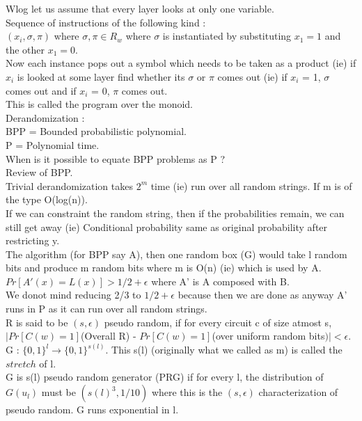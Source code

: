 \documentclass[solution,addpoints,12pt]{exam}
\begin{document}
Wlog let us assume that every layer looks at only one variable.\\
Sequence of instructions of the following kind :\\
$(x_i, \sigma, \pi)$ where $\sigma, \pi \in R_w$
where $\sigma$ is instantiated by substituting $x_1 = 1$ and the other
$x_1 = 0$.\\
Now each instance pops out a symbol which needs to be taken as a product (ie)
if $x_i$ is looked at some layer find whether its $\sigma$ or $\pi$ comes
out (ie) if $x_i$ = 1, $\sigma$ comes out and if $x_i$ = 0, $\pi$ comes out.\\


This is called the program over the monoid.\\

Derandomization :\\
BPP = Bounded probabilistic polynomial.\\
P = Polynomial time.\\
When is it possible to equate BPP problems as P ?\\
Review of BPP.\\
Trivial derandomization takes $2^m$ time (ie) run over all random
strings. If m is of the type O(log(n)).\\
If we can constraint the random string, then if the probabilities
remain, we can still get away (ie)
Conditional probability same as original probability after restricting
y.\\

The algorithm (for BPP say A), then one random box (G) would take l
random bits and produce m random bits where m is O(n) (ie) which
is used by A.\\
$Pr[A'(x) = L(x)] > 1/2 + \epsilon$ where A' is A composed with B.\\
We donot mind reducing 2/3 to $1/2 + \epsilon$ because then we are
done as anyway A' runs in P as it can run over all random strings.\\

R is said to be $(s, \epsilon)$ pseudo random, if for
every circuit c of size atmost s,\\
$|Pr[C(w) = 1]$(Overall R) - $Pr[C(w) = 1]$(over uniform random bits$)| < \epsilon$.\\
G : ${\{0, 1\}}^l \rightarrow {\{0, 1\}}^{s(l)}$. This s(l) (originally
what we called as m) is called the $stretch$ of l.\\
G is s(l) pseudo random generator (PRG) if for every l, the
distribution of $G(u_l)$ must be $(s(l)^3, 1/10)$ where this is the
$(s, \epsilon)$ characterization of pseudo random. G runs exponential
in l.\\
\end{document}
